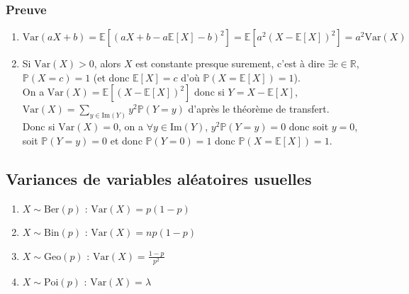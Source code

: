 \documentclass[a4paper,10pt]{book} %
\newcommand{\R}{\mathbb{R}}
\newcommand{\E}{\mathbb{E}} %
\renewcommand{\P}{\mathbb{P}} %
\newcommand{\Ima}{\mathrm{Im}} %
\newcommand{\Ber}{\mathrm{Ber}} %
\newcommand{\Bin}{\mathrm{Bin}} %
\newcommand{\Geo}{\mathrm{Geo}} %
\newcommand{\Poi}{\mathrm{Poi}} %
\newcommand{\Var}{\mathrm{Var}} %
\begin{document}
\subsubsection{Preuve}
\begin{enumerate}
\item $\Var(aX+b)=\E[(aX+b-a\E[X]-b)^2]=\E[a^2(X-\E[X])^2]=a^2\Var(X)$\\

\item Si $\Var(X)>0$, alors $X$ est constante presque surement, c'est à dire $\exists c\in \R$, $\P(X=c)=1$ (et donc $\E[X]=c$ d'où $\P(X=\E[X])=1$).\\

On a $\Var(X)=\E[(X-\E[X])^2]$ donc si $Y=X-\E[X]$, $\Var(X)=\sum_{y\in \Ima(Y)}y^2\P(Y=y)$ d'après le théorème de transfert.\\

Donc si $\Var(X)=0$, on a $\forall y\in \Ima(Y)$, $y^2\P(Y=y)=0$ donc soit $y=0$, soit $\P(Y=y)=0$ et donc $\P(Y=0)=1$ donc $\P(X=\E[X])=1$.
\end{enumerate}

\subsection{Variances de variables aléatoires usuelles}
\begin{enumerate}
\item $X\sim \Ber(p)$ : $\Var(X) = p(1-p)$
\item $X\sim \Bin(p)$ : $\Var(X) = np(1-p)$
\item $X\sim \Geo(p)$ : $\Var(X) = \frac{1-p}{p^2}$
\item $X\sim \Poi(p)$ : $\Var(X) = \lambda$
\end{enumerate}
\end{document}
